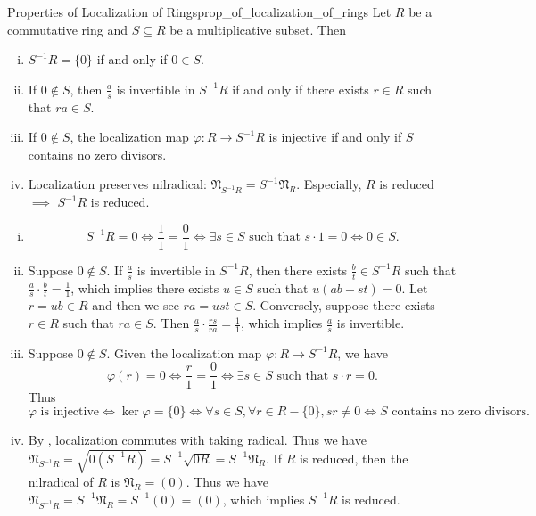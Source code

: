 \begin{proposition}{Properties of Localization of Rings}{prop_of_localization_of_rings}
    Let $R$ be a commutative ring and $S\subseteq R$ be a multiplicative subset. Then
    \begin{enumerate}[(i)]
        \item $S^{-1}R=\{0\}$ if and only if $0\in S$.
        \item If $0\notin S$, then $\frac{a}{s}$ is invertible in $S^{-1}R$ if and only if there exists $r\in R$ such that $ra\in S$.
        \item If $0\notin S$, the localization map $\varphi:R\to S^{-1}R$ is injective if and only if $S$ contains no zero divisors.
        \item Localization preserves nilradical: $\mathfrak{N}_{S^{-1}R}=S^{-1}\mathfrak{N}_R$. Especially, $R$ is reduced $\implies$ $S^{-1}R$ is reduced.
    \end{enumerate}
\end{proposition}

\begin{prf}
    \begin{enumerate}[(i)]
        \item \[
            S^{-1}R=0\iff \frac{1}{1}=\frac{0}{1}\iff \exists s\in S\text{ such that }s\cdot 1=0\iff 0\in S.
            \]
        \item Suppose $0\notin S$. If $\frac{a}{s}$ is invertible in $S^{-1}R$, then there exists $\frac{b}{t}\in S^{-1}R$ such that $\frac{a}{s}\cdot\frac{b}{t}=\frac{1}{1}$, which implies there exists $u\in S$ such that $u(ab-st)=0$. Let $r=ub\in R$ and then we see $ra=ust\in S$. Conversely, suppose there exists $r\in R$ such that $ra\in S$. Then $\frac{a}{s}\cdot\frac{rs}{ra}=\frac{1}{1}$, which implies $\frac{a}{s}$ is invertible.
        \item Suppose $0\notin S$. Given the localization map $\varphi:R\to S^{-1}R$, we have
        \[
            \varphi(r)=0\iff \frac{r}{1}=\frac{0}{1}\iff \exists s\in S\text{ such that }s\cdot r=0.
        \]
        Thus 
        $$
        \varphi\text{ is injective}\iff \ker \varphi=\{0\}\iff \forall s\in S,\forall r\in R-\{0\},sr\ne 0\iff S\text{ contains no zero divisors}.
        $$
        \item By , localization commutes with taking radical. Thus we have $\mathfrak{N}_{S^{-1}R}=\sqrt{0(S^{-1}R)}=S^{-1}\sqrt{0R}=S^{-1}\mathfrak{N}_R$. If $R$ is reduced, then the nilradical of $R$ is $\mathfrak{N}_R=(0)$. Thus we have $\mathfrak{N}_{S^{-1}R}=S^{-1}\mathfrak{N}_R=S^{-1}(0)=(0)$, which implies $S^{-1}R$ is reduced.
    \end{enumerate}
\end{prf}


